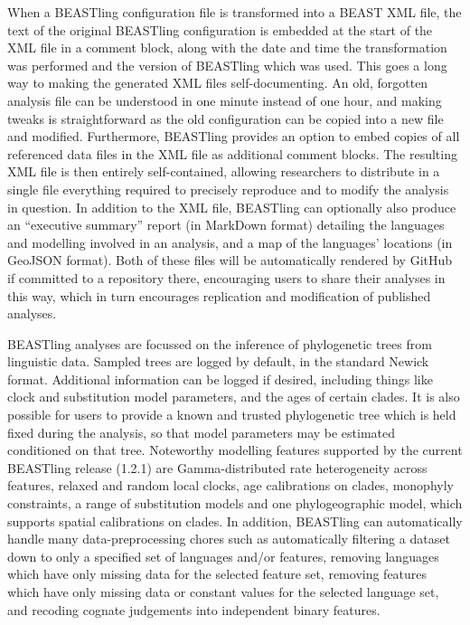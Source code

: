\documentclass[twocolumn,10pt]{scrartcl}
\begin{document}
When a BEASTling configuration file is transformed into a BEAST XML file, the text of the original BEASTling configuration is embedded at the start of the XML file in a comment block, along with the date and time the transformation was performed and the version of BEASTling which was used.  This goes a long way to making the generated XML files self-documenting.  An old, forgotten analysis file can be understood in one minute instead of one hour, and making tweaks is straightforward as the old configuration can be copied into a new file and modified.  Furthermore, BEASTling provides an option to embed copies of all referenced data files in the XML file as additional comment blocks.  The resulting XML file is then entirely self-contained, allowing researchers to distribute in a single file everything required to precisely reproduce and to modify the analysis in question.  In addition to the XML file, BEASTling can optionally also produce an ``executive summary'' report (in MarkDown format) detailing the languages and modelling involved in an analysis, and a map of the languages' locations (in GeoJSON format).  Both of these files will be automatically rendered by GitHub if committed to a repository there, encouraging users to share their analyses in this way, which in turn encourages replication and modification of published analyses.

BEASTling analyses are focussed on the inference of phylogenetic trees from linguistic data.  Sampled trees are logged by default, in the standard Newick format.  Additional information can be logged if desired, including things like clock and substitution model parameters, and the ages of certain clades.  It is also possible for users to provide a known and trusted phylogenetic tree which is held fixed during the analysis, so that model parameters may be estimated conditioned on that tree.  Noteworthy modelling features supported by the current BEASTling release (1.2.1) are Gamma-distributed rate heterogeneity across features, relaxed and random local clocks, age calibrations on clades, monophyly constraints, a range of substitution models and one phylogeographic model, which supports spatial calibrations on clades.  In addition, BEASTling can automatically handle many data-preprocessing chores such as automatically filtering a dataset down to only a specified set of languages and/or features, removing languages which have only missing data for the selected feature set, removing features which have only missing data or constant values for the selected language set, and recoding cognate judgements into independent binary features.
\end{document}
